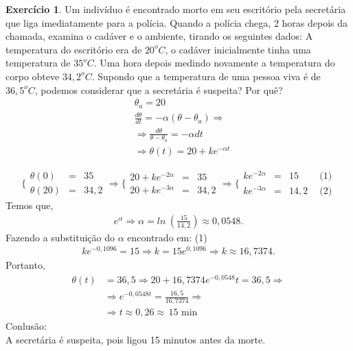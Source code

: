 \documentclass[a4paper,12pt,reqno,natbib]{amsart}
\theoremstyle{definition}
\newtheorem{exercise}{Exerc\'icio}
\begin{document}
\begin{exercise}
Um indivíduo é encontrado morto em seu escritório pela secretária que liga imediatamente para a polícia. Quando a polícia chega, 2 horas depois da chamada, examina o cadáver e 
o ambiente, tirando os seguintes dados: A temperatura do escritório era de $20^{o}C$, o cadáver inicialmente tinha uma temperatura de $35^{o}C$. Uma hora depois medindo novamente 
a temperatura do corpo obteve $34,2^{o}C$. Supondo que a temperatura de uma pessoa viva é de $36,5^{o}C$, podemos considerar que a secretária é suspeita? Por quê? 
\begin{align*}
	&\theta_a = 20\\
	&\frac{d\theta}{dt} = -\alpha(\theta - {\theta_a}) \Rightarrow\\
	&\Rightarrow \frac{d\theta}{\theta - {\theta_a}} = -\alpha dt\\
	&\Rightarrow  \theta(t) = 20 + ke^{-\alpha t}
\end{align*}

$$ \bigg \{
\begin{matrix}
	\theta (0) &=& 35\\
	\theta (20) &=& 34,2	 
\end{matrix}
\Rightarrow 
\bigg \{
\begin{matrix}
	20 + ke^{-2\alpha} &=& 35\\
	20 + ke^{-3\alpha} &=& 34,2	 
\end{matrix}
\Rightarrow 
\bigg \{
\begin{matrix}
	ke^{-2\alpha} &=& 15 &\hspace{5pt} \mbox{(1)}\\
	 ke^{-3\alpha} &=& 14,2&\hspace{5pt} \mbox{(2)}	 
\end{matrix}
$$
Temos que,
\begin{align*}
	e^{\alpha} \Rightarrow \alpha = ln \hspace{3pt}\left (\frac{15}{14,2}\right ) \approx 0,0548.
\end{align*}
Fazendo a substitui\c c\~ao do $\alpha$ encontrado em: (1)
\begin{align*}
	ke^{-0,1096} = 15 \Rightarrow k = 15e^{0,1096} \Rightarrow \boxed {k \approx 16,7374.}
\end{align*}
Portanto,
\begin{align*}
\theta(t) &= 36,5 \Rightarrow 20 + 16,7374e^{-0,0548}t = 36,5 \Rightarrow \\
&\Rightarrow e^{-0,0548t} = \frac{16,5}{16,7374} \Rightarrow \\
&\Rightarrow \boxed{t \approx 0,26 \approx \hspace{2pt} \mbox{15 min}}
\end{align*}
Conlus\~ao:\\
A secret\'aria \'e suspeita, pois ligou 15 minutos antes da morte.
\end{exercise}
\end{document}
